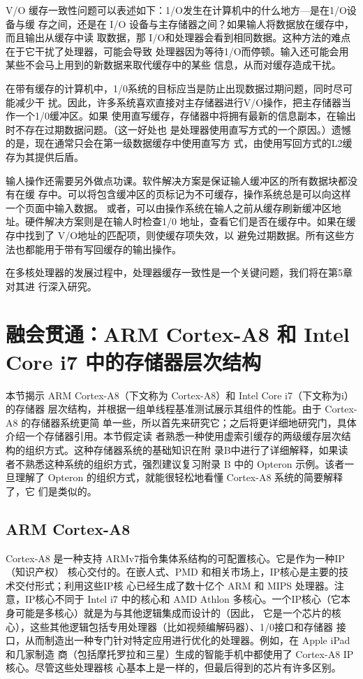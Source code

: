 V/O 缓存一致性问题可以表述如下：1/O发生在计算机中的什么地方—是在1/O设备与缓
存之间，还是在 I/O 设备与主存储器之间？如果输人将数据放在缓存中，而且输出从缓存中读
取数据，那 I/O和处理器会看到相同数据。这种方法的难点在于它干扰了处理器，可能会导致
处理器因为等待1/O而停顿。输入还可能会用某些不会马上用到的新数据来取代缓存中的某些
信息，从而对缓存造成干扰。

在带有缓存的计算机中，1/0系统的目标应当是防止出现数据过期问题，同时尽可能减少干
扰。因此，许多系统喜欢直接对主存储器进行V/O操作，把主存储器当作一个1/0缓冲区。如果
使用直写缓存，存储器中将拥有最新的信息副本，在输出时不存在过期数据问题。（这一好处也
是处理器使用直写方式的一个原因。）遗憾的是，现在通常只会在第一级数据缓存中使用直写方
式，由使用写回方式的L2缓存为其提供后盾。

输人操作还需要另外做点功课。软件解决方案是保证输人缓冲区的所有数据块都没有在缓
存中。可以将包含缓冲区的页标记为不可缓存，操作系统总是可以向这样一个页面中输入数据。
或者，可以由操作系统在输人之前从缓存刷新缓冲区地址。硬件解决方案则是在输人时检查1/0
地址，查看它们是否在缓存中。如果在缓存中找到了 V/O地址的匹配项，则使缓存项失效，以
避免过期数据。所有这些方法也都能用于带有写回缓存的输出操作。

在多核处理器的发展过程中，处理器缓存一致性是一个关键问题，我们将在第5章对其进
行深入研究。

\section{融会贯通：ARM Cortex-A8 和 Intel Core i7 中的存储器层次结构}

本节揭示 ARM Cortex-A8（下文称为 Cortex-A8）和 Intel Core i7（下文称为i）的存储器
层次结构，并根据一组单线程基准测试展示其组件的性能。由于 Cortex-A8 的存储器系统更简
单一些，所以首先来研究它；之后将更详细地研究门，具体介绍一个存储器引用。本节假定读
者熟悉一种使用虚索引缓存的两级缓存层次结构的组织方式。这种存储器系统的基础知识在附
录B中进行了详细解释，如果读者不熟悉这种系统的组织方式，强烈建议复习附录 B 中的 Opteron
示例。该者一旦理解了 Opteron 的组织方式，就能很轻松地看懂 Cortex-A8 系统的简要解释了，它
们是类似的。

\subsection{ARM Cortex-A8}

Cortex-A8 是一种支持 ARMv7指令集体系结构的可配置核心。它是作为一种IP（知识产权）
核心交付的。在嵌人式、PMD 和相关市场上，IP核心是主要的技术交付形式；利用这些IP核
心已经生成了数十亿个 ARM 和 MIPS 处理器。注意，IP核心不同于 Intel i7 中的核心和 AMD
Athlon 多核心。一个IP核心（它本身可能是多核心）就是为与其他逻辑集成而设计的（因此，
它是一个芯片的核心），这些其他逻辑包括专用处理器（比如视频编解码器）、1/0接口和存储器
接口，从而制造出一种专门针对特定应用进行优化的处理器。例如，在 Apple iPad 和几家制造
商（包括摩托罗拉和三星）生成的智能手机中都使用了 Cortex-A8 IP 核心。尽管这些处理器核
心基本上是一样的，但最后得到的芯片有许多区别。

